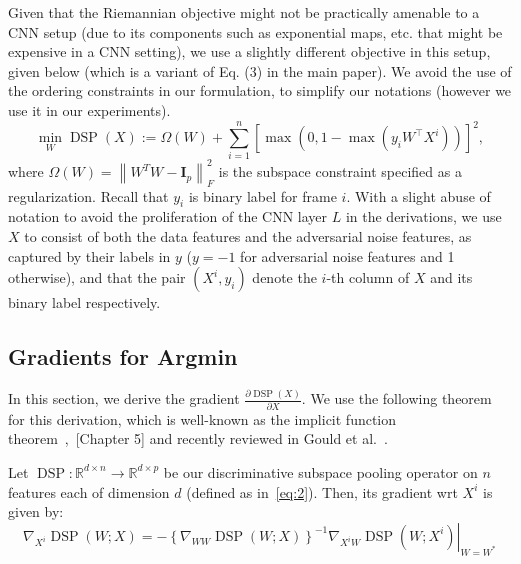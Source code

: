 \documentclass[runningheads]{llncs}
\newcommand{\reals}[1]{\mathbb{R}^{#1}}
\DeclareMathOperator*{\dsp}{DSP}
\newcommand{\eye}[1]{\mathbf{I}_{#1}}
\newcommand{\fnorm}[1]{\left\|{#1}\right\|_F}
\begin{document}
Given that the Riemannian objective might not be practically amenable to a CNN setup (due to its components such as exponential maps, etc. that might be expensive in a CNN setting), we use a slightly different objective in this setup, given below (which is a variant of Eq. (3) in the main paper). We avoid the use of the ordering constraints in our formulation, to simplify our notations (however we use it in our experiments).
\begin{equation}
\min_{W} \dsp(X) := \Omega(W) + \sum_{i=1}^n \left[\max\left(0, 1-\max\left(y_iW^\top X^i\right)\right)\right]^2,
\label{eq:2}
\end{equation}
where $\Omega(W)=\fnorm{W^TW-\eye{p}}^2$ is the subspace constraint specified as a regularization. Recall that $y_i$ is binary label for frame $i$. With a slight abuse of notation to avoid the proliferation of the CNN layer $L$ in the derivations, we use $X$ to consist of both the data features and the adversarial noise features, as captured by their labels in $y$ ($y=-1$ for adversarial noise features and 1 otherwise), and that the pair $(X^i, y_i)$ denote the $i$-th column of $X$ and its binary label respectively.



\subsection{Gradients for Argmin}



In this section, we derive the gradient $\frac{\partial \dsp(X)}{\partial X}$. We use the following theorem for this derivation, which is well-known as the implicit function theorem~\cite{chiang1984fundamental},~\cite{faugeras1993three}[Chapter 5] and recently reviewed in Gould et al.~\cite{gould2016differentiating}. 
\begin{theorem}
Let $\dsp:\reals{d\times n}\to\reals{d\times p}$ be our discriminative subspace pooling operator on $n$ features each of dimension $d$ (defined as in~\eqref{eq:2}). Then, its gradient wrt $X^i$ is given by:
\begin{equation}
\nabla_{X^i} \dsp(W; X) = -\left.\left\{\nabla_{WW} \dsp(W;X)\right\}^{-1} \nabla_{X^iW} \dsp(W; X^i)\right|_{W=W^*}
\end{equation}
\label{thm:1}
\end{theorem}
\end{document}
